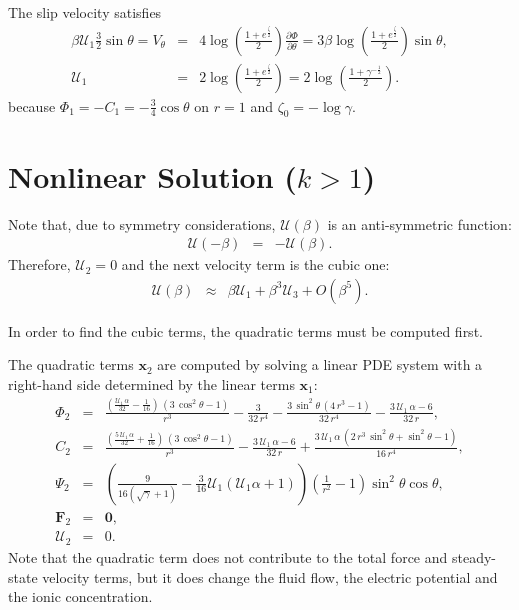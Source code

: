 \documentclass[final]{elsarticle}
\newcommand{\deriv}[2]{\frac{\partial #1}{\partial #2}}
\newcommand{\pars}[1]{\left(#1\right)}
\newcommand\bF{\boldsymbol{F}}
\newcommand\bx{\boldsymbol{x}}
\newcommand\bzero{\boldsymbol{0}}
\newcommand\cU{\mathscr{U}}
\begin{document}
\begin{appendix}
The slip velocity satisfies
\begin{eqnarray*}
\beta \cU_1 \frac{3}{2} \sin\theta =
V_\theta &=& 4 \log \pars{\frac{1 + e ^ \frac{\zeta}{2}}{2}} \deriv{\varPhi}{\theta} 
=
 3 \beta \log \pars{\frac{1 + e ^ \frac{\zeta}{2}}{2}} \sin\theta, \\
\cU_1 &=& 2 \log \pars{\frac{1 + e ^ \frac{\zeta}{2}}{2}} 
       =  2 \log \pars{\frac{1 + \gamma ^ {-\frac{1}{2}}}{2}}.
\end{eqnarray*}
because $\varPhi_1 = -C_1 = -\frac{3}{4} \cos\theta$ on $r=1$
and $\zeta_0 = -\log\gamma$.

\section{Nonlinear Solution ($k > 1$)} \label{app:cubic}
Note that, due to symmetry considerations, $\cU(\beta)$ is an anti-symmetric function:
\begin{eqnarray*}
\cU(-\beta) &=& -\cU(\beta).
\end{eqnarray*}
Therefore, $\cU_2 = 0$ and the next velocity term is the cubic one:
\begin{eqnarray*}
\cU(\beta) &\approx& \beta \cU_1 + \beta^3 \cU_3 + O(\beta^5).
\end{eqnarray*}

In order to find the cubic terms, the quadratic terms must be computed first.

The quadratic terms $\bx_2$ are computed by solving a linear PDE system 
with a right-hand side determined by the linear terms $\bx_1$:
\begin{eqnarray*}
\varPhi_2 &=& \frac{\left(\frac{\cU_1\, \alpha}{32} - \frac{1}{16}\right)\, \left(3\, {\cos^2\theta} - 1\right)}{r^3} - \frac{3}{32\, r^4} - \frac{3\, {\sin^2\theta}\, \left(4\, r^3 - 1\right)}{32\, r^4} - \frac{3\, \cU_1\, \alpha - 6}{32\, r},
\\
C_2 &=& \frac{\left(\frac{5\, \cU_1\, \alpha}{32} + \frac{1}{16}\right)\, \left(3\, {\cos^2\theta} - 1\right)}{r^3} - \frac{3\, \cU_1\, \alpha - 6}{32\, r} + \frac{3\, \cU_1\, \alpha\, \left(2\, r^3\, {\sin^2\theta} + {\sin^2\theta} - 1\right)}{16\, r^4},
\\
\Psi_2 &=& \pars{\frac{9}{16(\sqrt{\gamma}+1)} - \frac{3}{16} \cU_1 (\cU_1 \alpha + 1)}
 \left(\frac{1}{r^2} - 1\right) \sin^2\theta \cos\theta,  \\
\bF_2 &=& \bzero, \\ \cU_2 &=& 0.
\end{eqnarray*}
Note that the quadratic term does not contribute to the total force and steady-state 
velocity terms, but it does change the fluid flow, 
the electric potential and the ionic concentration.


\end{appendix}
\end{document}
